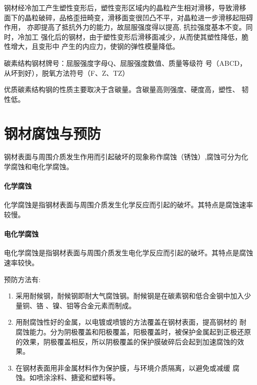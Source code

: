 \documentclass[12pt, a4paper, oneside, UTF8]{ctexbook}
\begin{document}
\begin{theorem}
	钢材经冷加工产生塑性变形后，塑性变形区域内的晶粒产生相对滑移，导致滑移
面下的晶粒破碎，品格歪扭畸变，滑移面变很凹凸不平，对晶粒进一步滑移起阻碍作用，
亦即提高了抵抗外力的能力，故屈服强度得以提高, 抗拉强度基本不变。同时，冷加工
强化后的钢材，由于塑性变形后滑移面减少，从而使其塑性降低，脆性增大，且变形中
产生的内应力，使钢的弹性模量降低。
\end{theorem}

碳素结构钢材牌号：屈服强度字母Q、屈服强度数值、质量等级符
号（ABCD，从坏到好），脱氧方法符号（F、Z、TZ）

优质碳素结构钢的性质主要取决于含碳量。含碳量高则强度、硬度高，塑性、
韧性低。

\section{钢材腐蚀与预防}

\begin{definition}
	钢材表面与周围介质发生作用而引起破坏的现象称作腐蚀（锈蚀）,腐蚀可分为化学腐蚀和电化学腐蚀。
\end{definition}

\paragraph{化学腐蚀}

化学腐蚀是指钢材表面与周围介质发生化学反应而引起的破坏。其特点是腐蚀速率较慢。

\paragraph{电化学腐蚀}

电化学腐蚀是指钢材表面与周围介质发生电化学反应而引起的破坏。其特点是腐蚀速率较快。

\begin{theorem}
	预防方法有:
	\begin{enumerate}
		\item 采用耐候钢，耐候钢即耐大气腐蚀钢。耐候钢是在碳素钢和低合金钢中加入少量铜、铬
、镍、钼等合金元素而制成。
		\item 用耐腐蚀性好的金属，以电镀或喷镀的方法覆盖在钢材表面，提高钢材的
耐腐蚀能力。分为阴极覆盖和阳极覆盖，阳极覆盖时，被保护金属起到正极还原的效果，阴极覆盖相反，所以阴极覆盖的保护膜破碎后会起到加速腐蚀的效果。
		\item 在钢材表面用非金属材料作为保护膜，与环境介质隔离，以避免或减缓
腐蚀。如喷涂涂料、搪瓷和塑料等。
	\end{enumerate}
\end{theorem}
\end{document}
